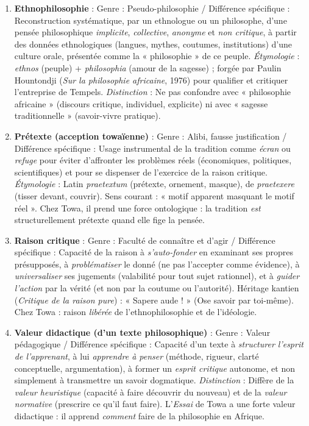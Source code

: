 \documentclass[11pt]{article}
\newcommand{\cle}[1]{{\popxbold\color{popdark}#1}}
\begin{document}
\begin{corrige}
\begin{enumerate}
\item \textbf{Ethnophilosophie} : \cle{Genre} : Pseudo-philosophie / \cle{Différence spécifique} : Reconstruction systématique, par un ethnologue ou un philosophe, d'une pensée philosophique \emph{implicite}, \emph{collective}, \emph{anonyme} et \emph{non critique}, à partir des données ethnologiques (langues, mythes, coutumes, institutions) d'une culture orale, présentée comme la « philosophie » de ce peuple. \textit{Étymologie} : \emph{ethnos} (peuple) + \emph{philosophia} (amour de la sagesse) ; forgée par Paulin Hountondji (\emph{Sur la philosophie africaine}, 1976) pour qualifier et critiquer l'entreprise de Tempels. \textit{Distinction} : Ne pas confondre avec « philosophie africaine » (discours critique, individuel, explicite) ni avec « sagesse traditionnelle » (savoir-vivre pratique).
\item \textbf{Prétexte (acception towaïenne)} : \cle{Genre} : Alibi, fausse justification / \cle{Différence spécifique} : Usage instrumental de la tradition comme \emph{écran} ou \emph{refuge} pour éviter d'affronter les problèmes réels (économiques, politiques, scientifiques) et pour se dispenser de l'exercice de la raison critique. \textit{Étymologie} : Latin \emph{praetextum} (prétexte, ornement, masque), de \emph{praetexere} (tisser devant, couvrir). Sens courant : « motif apparent masquant le motif réel ». Chez Towa, il prend une force ontologique : la tradition \emph{est} structurellement prétexte quand elle fige la pensée.
\item \textbf{Raison critique} : \cle{Genre} : Faculté de connaître et d'agir / \cle{Différence spécifique} : Capacité de la raison à \emph{s'auto-fonder} en examinant ses propres présupposés, à \emph{problématiser} le donné (ne pas l'accepter comme évidence), à \emph{universaliser} ses jugements (valabilité pour tout sujet rationnel), et à \emph{guider l'action} par la vérité (et non par la coutume ou l'autorité). Héritage kantien (\emph{Critique de la raison pure}) : « Sapere aude ! » (Ose savoir par toi-même). Chez Towa : raison \emph{libérée} de l'ethnophilosophie et de l'idéologie.
\item \textbf{Valeur didactique (d'un texte philosophique)} : \cle{Genre} : Valeur pédagogique / \cle{Différence spécifique} : Capacité d'un texte à \emph{structurer l'esprit de l'apprenant}, à lui \emph{apprendre à penser} (méthode, rigueur, clarté conceptuelle, argumentation), à former un \emph{esprit critique} autonome, et non simplement à transmettre un savoir dogmatique. \textit{Distinction} : Diffère de la \emph{valeur heuristique} (capacité à faire découvrir du nouveau) et de la \emph{valeur normative} (prescrire ce qu'il faut faire). L'\emph{Essai} de Towa a une forte valeur didactique : il apprend \emph{comment} faire de la philosophie en Afrique.
\end{enumerate}
\end{corrige}
\end{document}
